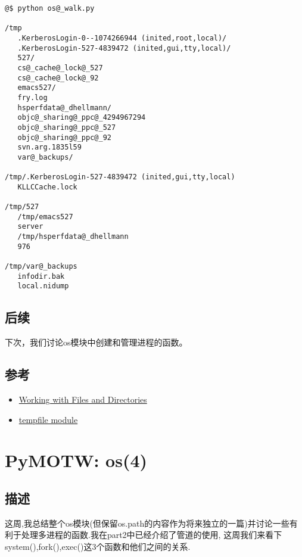 \documentclass[letterpaper,10pt,english]{manual}
\begin{document}
\begin{Verbatim}[commandchars=@\[\]]
@$ python os@_walk.py

/tmp
   .KerberosLogin-0--1074266944 (inited,root,local)/
   .KerberosLogin-527-4839472 (inited,gui,tty,local)/
   527/
   cs@_cache@_lock@_527
   cs@_cache@_lock@_92
   emacs527/
   fry.log
   hsperfdata@_dhellmann/
   objc@_sharing@_ppc@_4294967294
   objc@_sharing@_ppc@_527
   objc@_sharing@_ppc@_92
   svn.arg.1835l59
   var@_backups/

/tmp/.KerberosLogin-527-4839472 (inited,gui,tty,local)
   KLLCCache.lock

/tmp/527
   /tmp/emacs527
   server
   /tmp/hsperfdata@_dhellmann
   976

/tmp/var@_backups
   infodir.bak
   local.nidump
\end{Verbatim}


\subsection{后续}

下次，我们讨论os模块中创建和管理进程的函数。


\subsection{参考}
\begin{itemize}
\item {} 
\href{http://docs.python.org/lib/os-file-dir.html}{Working with Files and Directories}

\item {} 
\href{http://docs.python.org/lib/module-tempfile.html}{tempfile module}

\end{itemize}

\resetcurrentobjects


\section{PyMOTW: os(4)}


\subsection{描述}

这周,我总结整个os模块(但保留os.path的内容作为将来独立的一篇)并讨论一些有利于处理多进程的函数.我在part2中已经介绍了管道的使用, 这周我们来看下system(),fork(),exec()这3个函数和他们之间的关系.
\end{document}
